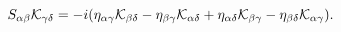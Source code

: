 \begin{equation}
S_{\alpha\beta}{\cal K}_{\gamma\delta}=-i(\eta_{\alpha\gamma}{\cal
K}_{\beta\delta}-\eta_{\beta\gamma} {\cal
K}_{\alpha\delta}+\eta_{\alpha\delta}{\cal
K}_{\beta\gamma}-\eta_{\beta\delta}{\cal K}_{\alpha\gamma}).
\label{eq:spi}
\end{equation}

